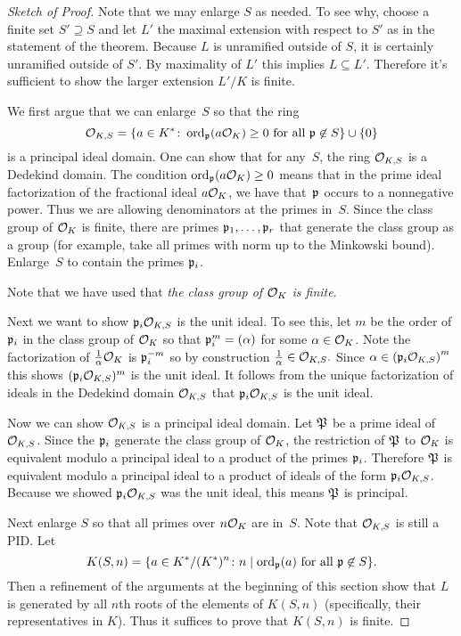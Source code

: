 \begin{proof}[Sketch of Proof]
	Note that we may enlarge $S$ as needed. To see why,
	choose a finite set $S' \supseteq S$ and let $L'$ the
	maximal extension with respect to $S'$ as in the
	statement of the theorem. Because $L$ is unramified
	outside of $S$, it is certainly unramified outside of
	$S'$. By maximality of $L'$ this implies $L \subseteq L'$.
	Therefore it's sufficient to show the larger extension
	$L'/K$ is finite.
	
	We first argue that we can enlarge~$S$ so that the ring
	$$
		\O_{K,S} =
			\{
			a \in K^* \colon \ord_\p(a\O_K) \geq 0 \text{ for all } \p\not\in S
			\}
			\union\{0\}
	$$
	is a principal ideal domain.
	One can show that for any~$S$, the ring $\O_{K,S}$ is a Dedekind domain.
	The condition $ \ord_\p(a\O_K) \geq 0$
	means that in the prime ideal factorization of the fractional ideal
	$a\O_K$, we have that~$\p$ occurs to a nonnegative power. Thus we are
	allowing denominators at the primes in~$S$. Since the class group of
	$\O_K$ is finite, there are primes $\p_1,\ldots, \p_r$ that generate
	the class group as a group (for example, take all primes with norm up to
	the Minkowski bound). Enlarge~$S$ to contain the primes $\p_i$.
	
	Note that we have used that \emph{the class group of $\O_K$ is finite}.
	
	Next we want to show $\p_i\O_{K,S}$ is the unit ideal. To see this,
	let $m$ be the order of $\p_i$ in the class group of $\O_{K}$ so that
	$\p_i^m = (\alpha)$ for some $\alpha\in \O_{K}$. Note the factorization
	of $\frac{1}{\alpha}\O_{K}$ is $\p_i^{-m}$ so by construction
	$\frac{1}{\alpha}\in\O_{K,S}.$ Since
	$\alpha\in \left(\p_i\O_{K,S}\right)^m$ this shows $(\p_i\O_{K,S})^m$
	is the unit ideal. It follows from the unique factorization of ideals
	in the Dedekind domain $\O_{K,S}$ that $\p_i\O_{K,S}$ is the unit ideal.
	
	Now we can show $\O_{K,S}$ is a principal ideal domain. Let $\P$
	be a prime ideal of $\O_{K,S}$. Since the $\p_i$ generate
	the class group of $\O_K$, the restriction of $\P$ to $\O_K$ is
	equivalent modulo a principal ideal to a product of the primes
	$\p_i$. Therefore $\P$ is equivalent modulo a principal ideal
	to a product of ideals of the form $\p_i\O_{K,S}$. Because we showed
	$\p_i\O_{K,S}$ was the unit ideal, this means $\P$ is principal.
	
	Next enlarge $S$ so that all primes over $n\O_K$ are in~$S$.
	Note that $\O_{K,S}$ is still a PID.  Let
	$$
	 K(S,n) =
	 	\{
	 	a \in K^*/(K^*)^n \colon n \mid \ord_\p(a) \text{ for all } \p\not\in S
	 	\}.
	$$
	Then a refinement of the arguments at the beginning of
	this section show that $L$ is generated by all $n$th roots
	of the elements of $K(S,n)$ (specifically, their representatives in $K$).
	Thus it suffices to prove that $K(S,n)$ is finite.
	

\end{proof}

